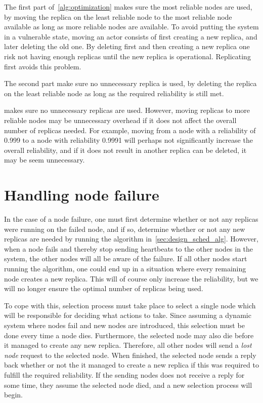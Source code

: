 \documentclass{cslthse-msc}
\begin{document}
The first part of~\cref{alg:optimization} makes sure the most reliable nodes are used, by moving the replica on the least reliable node to the most reliable node available as long as more reliable nodes are available. To avoid putting the system in a vulnerable state, moving an actor consists of first creating a new replica, and later deleting the old one. By deleting first and then creating a new replica one risk not having enough replicas until the new replica is operational. Replicating first avoids this problem.

The second part make sure no unnecessary replica is used, by deleting the replica on the least reliable node as long as the required reliability is still met.

 makes sure no unnecessary replicas are used. However, moving replicas to more reliable nodes may be unnecessary overhead if it does not affect the overall number of replicas needed. For example, moving from a node with a reliability of 0.999 to a node with reliability 0.9991 will perhaps not significantly increase the overall reliability, and if it does not result in another replica can be deleted, it may be seem unnecessary.

\section{Handling node failure} \label{sec:design_handling_failure}
In the case of a node failure, one must first determine whether or not any replicas were running on the failed node, and if so, determine whether or not any new replicas are needed by running the algorithm in~\cref{sec:design_sched_alg}. However, when a node fails and thereby stop sending heartbeats to the other nodes in the system, the other nodes will all be aware of the failure. If all other nodes start running the algorithm, one could end up in a situation where every remaining node creates a new replica. This will of course only increase the reliability, but we will no longer ensure the optimal number of replicas being used. 

To cope with this, selection process must take place to select a single node which will be responsible for deciding what actions to take. Since assuming a dynamic system where nodes fail and new nodes are introduced, this selection must be done every time a node dies. Furthermore, the selected node may also die before it managed to create any new replica. Therefore, all other nodes will send a \emph{lost node} request to the selected node. When finished, the selected node sends a reply back whether or not the it managed to create a new replica if this was required to fulfill the required reliability. If the sending nodes does not receive a reply for some time, they assume the selected node died, and a new selection process will begin.
\end{document}
